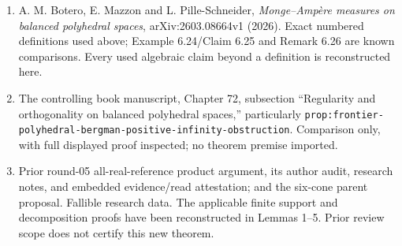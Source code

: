 \documentclass[
  10pt,
]{article}
\providecommand{\tightlist}{%
  \setlength{\itemsep}{0pt}\setlength{\parskip}{0pt}}
\begin{document}
\begin{enumerate}
\def\labelenumi{\arabic{enumi}.}
\tightlist
\item
  A. M. Botero, E. Mazzon and L. Pille-Schneider, \emph{Monge--Ampère
  measures on balanced polyhedral spaces}, arXiv:2603.08664v1 (2026).
  Exact numbered definitions used above; Example 6.24/Claim 6.25 and
  Remark 6.26 are known comparisons. Every used algebraic claim beyond a
  definition is reconstructed here.
\item
  The controlling book manuscript, Chapter 72, subsection ``Regularity
  and orthogonality on balanced polyhedral spaces,'' particularly
  \texttt{prop:frontier-}\allowbreak{}\texttt{polyhedral-}\allowbreak{}\texttt{bergman-}\allowbreak{}\texttt{positive-}\allowbreak{}\texttt{infinity-}\allowbreak{}\texttt{obstruction}.
  Comparison only, with full displayed proof inspected; no theorem
  premise imported.
\item
  Prior round-05 all-real-reference product argument, its author audit,
  research notes, and embedded evidence/read attestation; and the
  six-cone parent proposal. Fallible research data. The applicable
  finite support and decomposition proofs have been reconstructed in
  Lemmas 1--5. Prior review scope does not certify this new theorem.
\end{enumerate}
\end{document}
